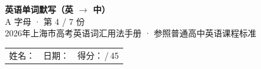 \documentclass[10pt,a4paper]{article}
\begin{document}
\pagestyle{plain}

\begin{center}
{\LARGE\bfseries 英语单词默写（英 $\to$ 中）}\\[0.22em]
{\large A 字母 · 第 4 / 7 份}\\[0.18em]
{\small 2026年上海市高考英语词汇用法手册 · 参照普通高中英语课程标准}
\end{center}

\vspace{0.25em}
\noindent\begin{tabular}{@{}p{}@{}p{}@{}p{}@{}}
姓名：\underline{\hspace{2.0cm}} & 日期：\underline{\hspace{2.0cm}} & 得分：\underline{\hspace{1.3cm}}\,/\,45 \\
\end{tabular}

\vspace{0.3em}

\vspace{0.08em}
\end{document}
